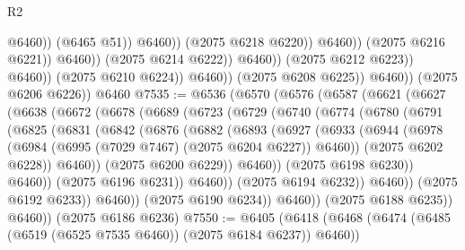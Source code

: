 \begin{lexlean}{R2}
\begin{coremodule}
                                                    @6460))
                                                (@6465 @51))
                                              @6460))
                                          (@2075 @6218 @6220))
                                        @6460))
                                    (@2075 @6216 @6221))
                                  @6460))
                              (@2075 @6214 @6222))
                            @6460))
                        (@2075 @6212 @6223))
                      @6460))
                  (@2075 @6210 @6224))
                @6460))
            (@2075 @6208 @6225))
          @6460))
      (@2075 @6206 @6226))
    @6460
@7535 := @6536
    (@6570
      (@6576
        (@6587
          (@6621
            (@6627
              (@6638
                (@6672
                  (@6678
                    (@6689
                      (@6723
                        (@6729
                          (@6740
                            (@6774
                              (@6780
                                (@6791
                                  (@6825
                                    (@6831
                                      (@6842
                                        (@6876
                                          (@6882
                                            (@6893
                                              (@6927
                                                (@6933
                                                  (@6944
                                                    (@6978
                                                      (@6984
                                                        (@6995 (@7029 @7467) (@2075 @6204 @6227))
                                                        @6460))
                                                    (@2075 @6202 @6228))
                                                  @6460))
                                              (@2075 @6200 @6229))
                                            @6460))
                                        (@2075 @6198 @6230))
                                      @6460))
                                  (@2075 @6196 @6231))
                                @6460))
                            (@2075 @6194 @6232))
                          @6460))
                      (@2075 @6192 @6233))
                    @6460))
                (@2075 @6190 @6234))
              @6460))
          (@2075 @6188 @6235))
        @6460))
    (@2075 @6186 @6236)
@7550 := @6405
    (@6418
      (@6468 (@6474 (@6485 (@6519 (@6525 @7535 @6460)) (@2075 @6184 @6237)) @6460))

\end{coremodule}
\end{lexlean}
